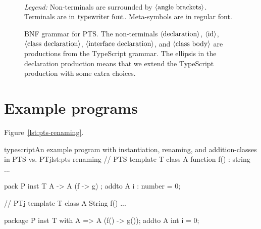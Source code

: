 \begin{figure}
\begin{bnf*}
        {  \bnfsp \bnfts{->} \bnfsp {} }\\
        {  \bnfsp {} \bnfsp {} \bnfsp {} }\\
        {  \bnfor \bnfes }\\
    \end{bnf*}
    \caption{BNF grammar for PTS. The non-terminals $\langle \textrm{declaration} \rangle$, $\langle \textrm{id} \rangle$, $\langle \textrm{class declaration} \rangle$, $\langle \textrm{interface declaration} \rangle$, and $\langle \textrm{class body} \rangle$ are productions from the TypeScript grammar.
    The ellipsis in the declaration production means that we extend the TypeScript production with some extra choices.}

    \textit{Legend:} Non-terminals are surrounded by $\langle \textrm{angle brackets} \rangle$.
    Terminals are in $\textrm{typewriter font}$.
    Meta-symbols are in regular font.
    \label{fig:pts-grammar}
\end{figure}

\section{Example programs}\label{sec:example-programs}

Figure~\vref{lst:pts-renaming}.

\begin{code}{typescript}{An example program with instantiation, renaming, and addition-classes in PTS vs. PTj}{lst:pts-renaming}
    // PTS
    template T {
        class A {
            function f() : string {
                ...
            }
        }
    }

    pack P {
        inst T { A -> A (f -> g) };
        addto A {
            i : number = 0;
        }
    }

    // PTj
    template T {
        class A {
            String f() {
                ...
            }
        }
    }

    package P {
        inst T with A => A (f() -> g());
        addto A {
            int i = 0;
        }
    }
\end{code}

